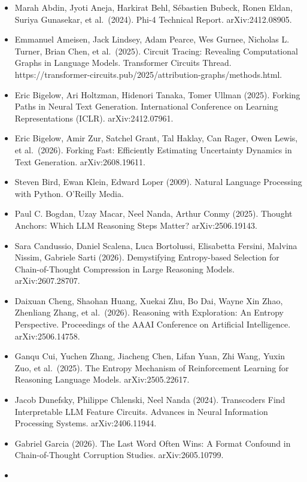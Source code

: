 \documentclass[
  10pt,
  a4paper,
]{article}
\providecommand{\tightlist}{%
  \setlength{\itemsep}{0pt}\setlength{\parskip}{0pt}}
\begin{document}
\begin{itemize}
\tightlist
\item
  Marah Abdin, Jyoti Aneja, Harkirat Behl, Sébastien Bubeck, Ronen Eldan, Suriya Gunasekar, et al.~(2024). Phi-4 Technical Report. arXiv:2412.08905.
\item
  Emmanuel Ameisen, Jack Lindsey, Adam Pearce, Wes Gurnee, Nicholas L. Turner, Brian Chen, et al.~(2025). Circuit Tracing: Revealing Computational Graphs in Language Models. Transformer Circuits
  Thread. https://transformer-circuits.pub/2025/attribution-graphs/methods.html.
\item
  Eric Bigelow, Ari Holtzman, Hidenori Tanaka, Tomer Ullman (2025). Forking Paths in Neural Text Generation. International Conference on Learning Representations (ICLR). arXiv:2412.07961.
\item
  Eric Bigelow, Amir Zur, Satchel Grant, Tal Haklay, Can Rager, Owen Lewis, et al.~(2026). Forking Fast: Efficiently Estimating Uncertainty Dynamics in Text Generation. arXiv:2608.19611.
\item
  Steven Bird, Ewan Klein, Edward Loper (2009). Natural Language Processing with Python. O'Reilly Media.
\item
  Paul C. Bogdan, Uzay Macar, Neel Nanda, Arthur Conmy (2025). Thought Anchors: Which LLM Reasoning Steps Matter? arXiv:2506.19143.
\item
  Sara Candussio, Daniel Scalena, Luca Bortolussi, Elisabetta Fersini, Malvina Nissim, Gabriele Sarti (2026). Demystifying Entropy-based Selection for Chain-of-Thought Compression in Large Reasoning
  Models. arXiv:2607.28707.
\item
  Daixuan Cheng, Shaohan Huang, Xuekai Zhu, Bo Dai, Wayne Xin Zhao, Zhenliang Zhang, et al.~(2026). Reasoning with Exploration: An Entropy Perspective. Proceedings of the AAAI Conference on Artificial
  Intelligence. arXiv:2506.14758.
\item
  Ganqu Cui, Yuchen Zhang, Jiacheng Chen, Lifan Yuan, Zhi Wang, Yuxin Zuo, et al.~(2025). The Entropy Mechanism of Reinforcement Learning for Reasoning Language Models. arXiv:2505.22617.
\item
  Jacob Dunefsky, Philippe Chlenski, Neel Nanda (2024). Transcoders Find Interpretable LLM Feature Circuits. Advances in Neural Information Processing Systems. arXiv:2406.11944.
\item
  Gabriel Garcia (2026). The Last Word Often Wins: A Format Confound in Chain-of-Thought Corruption Studies. arXiv:2605.10799.
\item

\end{itemize}
\end{document}

